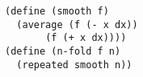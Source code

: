\documentclass[a4paper,12pt]{article}
\begin{document}
\begin{lstlisting}
(define (smooth f)
  (average (f (- x dx))
	   (f (+ x dx))))
(define (n-fold f n)
  (repeated smooth n))
\end{lstlisting}
\end{document}
